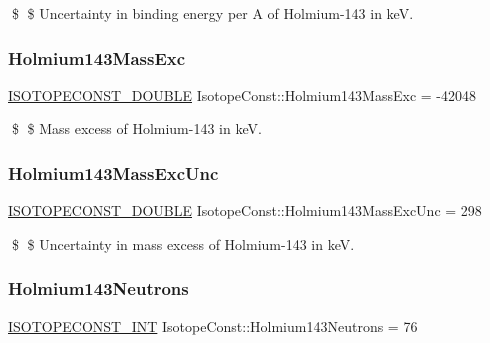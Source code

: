 \$ \$ Uncertainty in binding energy per A of Holmium-\/143 in keV. \mbox{\label{group___isotope_const-_holmium-_ho143_gaa09c23279b50063084315368652ce50b}} 
\subsubsection{\texorpdfstring{Holmium143\+Mass\+Exc}{Holmium143MassExc}}
{\footnotesize\ttfamily \mbox{\hyperlink{group___isotope_const-_macros_ga8f45a7272ce02c0b4c65c44636ed719a}{I\+S\+O\+T\+O\+P\+E\+C\+O\+N\+S\+T\+\_\+\+D\+O\+U\+B\+LE}} Isotope\+Const\+::\+Holmium143\+Mass\+Exc = -\/42048}

\$ \$ Mass excess of Holmium-\/143 in keV. \mbox{\label{group___isotope_const-_holmium-_ho143_ga87d3eec40b83a7aa9405f7906457bd1e}} 
\subsubsection{\texorpdfstring{Holmium143\+Mass\+Exc\+Unc}{Holmium143MassExcUnc}}
{\footnotesize\ttfamily \mbox{\hyperlink{group___isotope_const-_macros_ga8f45a7272ce02c0b4c65c44636ed719a}{I\+S\+O\+T\+O\+P\+E\+C\+O\+N\+S\+T\+\_\+\+D\+O\+U\+B\+LE}} Isotope\+Const\+::\+Holmium143\+Mass\+Exc\+Unc = 298}

\$ \$ Uncertainty in mass excess of Holmium-\/143 in keV. \mbox{\label{group___isotope_const-_holmium-_ho143_gac0d3f489fd72cb7de733675e22b09189}} 
\subsubsection{\texorpdfstring{Holmium143\+Neutrons}{Holmium143Neutrons}}
{\footnotesize\ttfamily \mbox{\hyperlink{group___isotope_const-_macros_ga5f18360b3e99483a35c32d789e62621c}{I\+S\+O\+T\+O\+P\+E\+C\+O\+N\+S\+T\+\_\+\+I\+NT}} Isotope\+Const\+::\+Holmium143\+Neutrons = 76}

